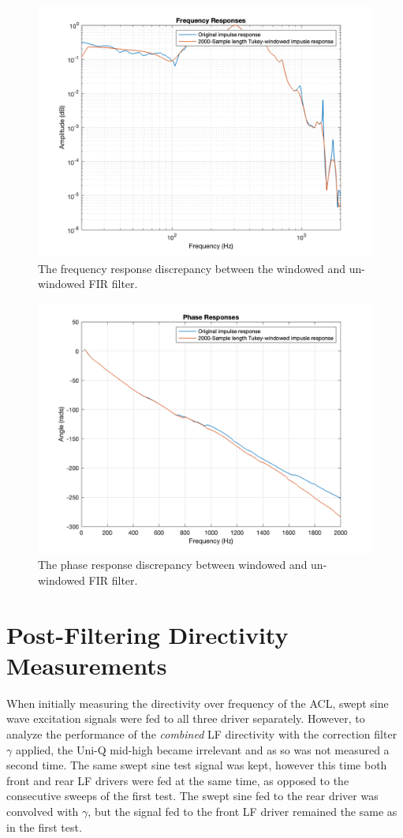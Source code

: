 \documentclass{report}
\begin{document}
            \begin{figure}[H]
                \centering
                \includegraphics[width=0.7\linewidth]{figs/tukeyFrequency.png}
                \caption{The frequency response discrepancy between the windowed and un-windowed FIR filter.}
                \label{tukeyFrequency}
            \end{figure}

            \begin{figure}[H]
                \centering
                \includegraphics[width=0.7\linewidth]{figs/tukeyPhase.png}
                \caption{The phase response discrepancy between windowed and un-windowed FIR filter.}
                \label{tukeyPhase}
            \end{figure}

            \newpage

    \section{Post-Filtering Directivity Measurements}
            When initially measuring the directivity over frequency of the ACL, swept sine wave excitation signals were fed to all three driver separately.
            However, to analyze the performance of the \textit{combined} LF directivity with the correction filter $\gamma$ applied, the Uni-Q mid-high became irrelevant and as so was not measured a second time.
            The same swept sine test signal was kept, however this time both front and rear LF drivers were fed at the same time, as opposed to the consecutive sweeps of the first test.
            The swept sine fed to the rear driver was convolved with $\gamma$, but the signal fed to the front LF driver remained the same as in the first test.
            
\end{document}
